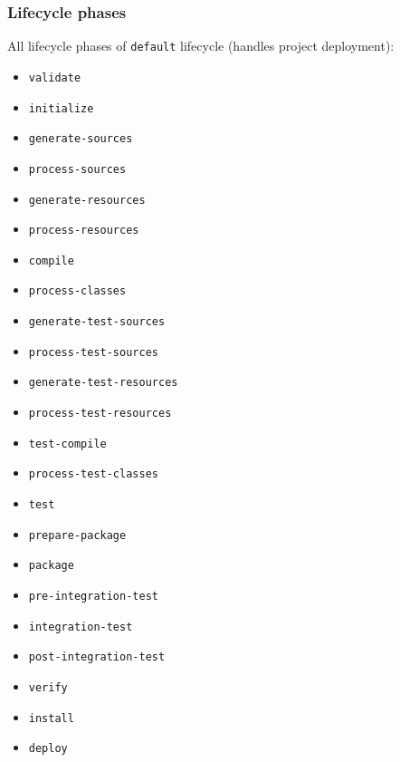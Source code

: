 \documentclass[10pt,xcolor=pdflatex]{beamer}
\begin{document}
\begin{frame}\frametitle{Lifecycle phases}
All lifecycle phases of \texttt{default} lifecycle (handles project deployment):
\begin{multicols}{2}
\begin{footnotesize}
\begin{itemize}
  \item \texttt{validate}
  \item \texttt{initialize}
  \item \texttt{generate-sources}
  \item \texttt{process-sources}
  \item \texttt{generate-resources}
  \item \texttt{process-resources}
  \item \texttt{compile}
  \item \texttt{process-classes}
  \item \texttt{generate-test-sources}
  \item \texttt{process-test-sources}
  \item \texttt{generate-test-resources}
  \item \texttt{process-test-resources}
  \item \texttt{test-compile}
  \item \texttt{process-test-classes}
  \item \texttt{test}
  \item \texttt{prepare-package}
  \item \texttt{package}
  \item \texttt{pre-integration-test}
  \item \texttt{integration-test}
  \item \texttt{post-integration-test}
  \item \texttt{verify}
  \item \texttt{install}
  \item \texttt{deploy}
\end{itemize}
\end{footnotesize}
\end{multicols}
\end{frame}
\end{document}
